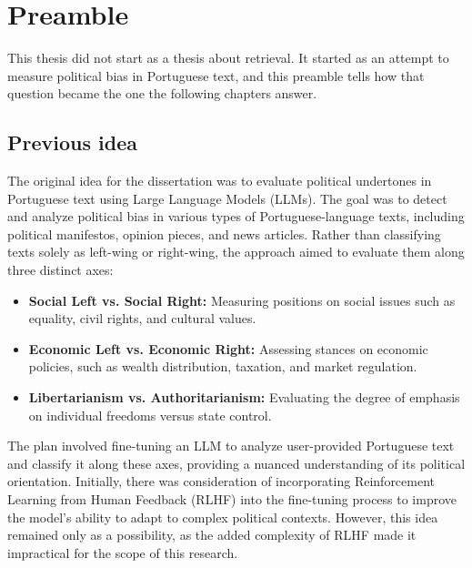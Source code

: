 \chapter*{Preamble}
{}

This thesis did not start as a thesis about retrieval. It started as an
attempt to measure political bias in Portuguese text, and this preamble tells
how that question became the one the following chapters answer.

\section*{Previous idea}

The original idea for the dissertation was to evaluate political undertones in Portuguese text using Large Language Models (LLMs). The goal was to detect and analyze political bias in various types of Portuguese-language texts, including political manifestos, opinion pieces, and news articles. Rather than classifying texts solely as left-wing or right-wing, the approach aimed to evaluate them along three distinct axes:

\begin{itemize}
    \item \textbf{Social Left vs. Social Right:} Measuring positions on social issues such as equality, civil rights, and cultural values.
    \item \textbf{Economic Left vs. Economic Right:} Assessing stances on economic policies, such as wealth distribution, taxation, and market regulation.
    \item \textbf{Libertarianism vs. Authoritarianism:} Evaluating the degree of emphasis on individual freedoms versus state control.
\end{itemize}

The plan involved fine-tuning an LLM to analyze user-provided Portuguese text and classify it along these axes, providing a nuanced understanding of its political orientation. Initially, there was consideration of incorporating Reinforcement Learning from Human Feedback (RLHF) into the fine-tuning process to improve the model's ability to adapt to complex political contexts. However, this idea remained only as a possibility, as the added complexity of RLHF made it impractical for the scope of this research.

